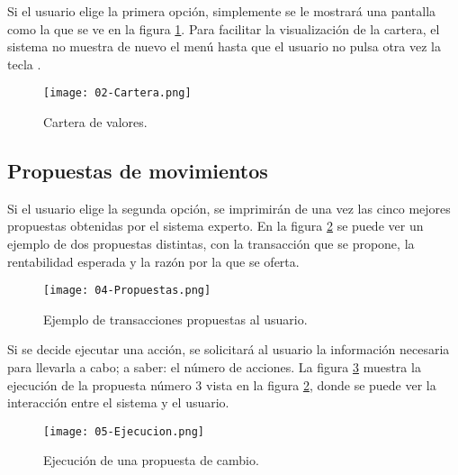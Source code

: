 \documentclass[a4paper, 11pt, titlepage]{article}
\begin{document}
    Si el usuario elige la primera opción, simplemente se le mostrará una pantalla como la que se ve en la figura \ref{fig:cartera}. Para facilitar la visualización de la cartera, el sistema no muestra de nuevo el menú hasta que el usuario no pulsa otra vez la tecla \code{[Entrar]}.

    \begin{center}
        \begin{figure}[!htb]
            \centering
            \texttt{[image: 02-Cartera.png]}
            \caption{Cartera de valores.}
            \label{fig:cartera}
        \end{figure}
    \end{center}


    \subsection{Propuestas de movimientos}

    Si el usuario elige la segunda opción, se imprimirán de una vez las cinco mejores propuestas obtenidas por el sistema experto. En la figura \ref{fig:propuestas} se puede ver un ejemplo de dos propuestas distintas, con la transacción que se propone, la rentabilidad esperada y la razón por la que se oferta.

    \begin{center}
        \begin{figure}[!htb]
            \centering
            \texttt{[image: 04-Propuestas.png]}
            \caption{Ejemplo de transacciones propuestas al usuario.}
            \label{fig:propuestas}
        \end{figure}
    \end{center}

    Si se decide ejecutar una acción, se solicitará al usuario la información necesaria para llevarla a cabo; a saber: el número de acciones. La figura \ref{fig:ejecucion} muestra la ejecución de la propuesta número 3 vista en la figura \ref{fig:propuestas}, donde se puede ver la interacción entre el sistema y el usuario.

    \begin{center}
        \begin{figure}[!htb]
            \centering
            \texttt{[image: 05-Ejecucion.png]}
            \caption{Ejecución de una propuesta de cambio.}
            \label{fig:ejecucion}
        \end{figure}
    \end{center}
\end{document}
